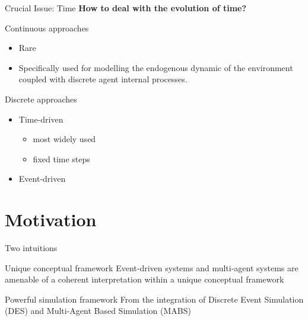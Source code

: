 \documentclass[presentation]{beamer} %
\begin{document}
\begin{frame}{Crucial Issue: Time}
\textbf{How to deal with the evolution of time?}

\begin{block}{Continuous approaches}
	\begin{itemize}
		\item Rare
		\item Specifically used for modelling the endogenous dynamic of the environment coupled with discrete agent internal processes. 
	\end{itemize}
\end{block}

\begin{block}{Discrete approaches}
	\begin{itemize}
		\item Time-driven	
		\begin{itemize}
			\item most widely used
			\item fixed time steps
		\end{itemize}
		\item Event-driven
	\end{itemize}
\end{block}

\end{frame}



\section{Motivation}

\begin{frame}{Two intuitions}
  \begin{block}{Unique conceptual framework}
    Event-driven systems and multi-agent systems are amenable of a coherent interpretation within a unique conceptual framework
  \end{block}
  \begin{block}{Powerful simulation framework}
    From the integration of Discrete Event Simulation (DES) and Multi-Agent Based Simulation (MABS) \cite{meyer-mabs2014}
  \end{block}
\end{frame}
\end{document}
